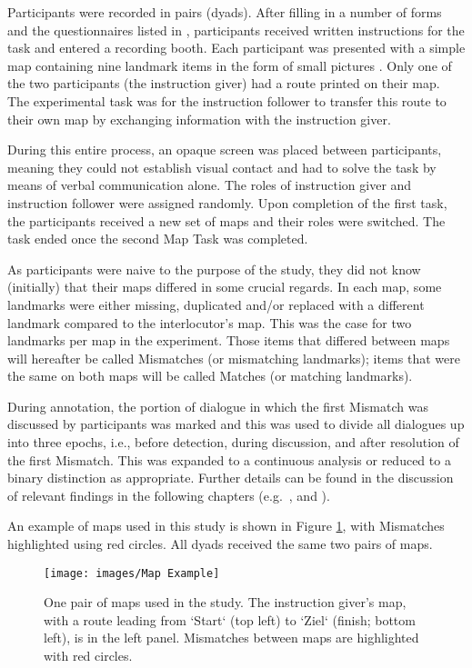 Participants were recorded in pairs (dyads). After filling in a number of forms and the questionnaires listed in , participants received written instructions for the task and entered a recording booth. Each participant was presented with a simple map containing nine landmark items in the form of small pictures \citep[materials adapted from][]{griceMapTasksItalian2003}. Only one of the two participants (the instruction giver) had a route printed on their map. The experimental task was for the instruction follower to transfer this route to their own map by exchanging information with the instruction giver.

During this entire process, an opaque screen was placed between participants, meaning they could not establish visual contact and had to solve the task by means of verbal communication alone. The roles of instruction giver and instruction follower were assigned randomly. Upon completion of the first task, the participants received a new set of maps and their roles were switched. The task ended once the second Map Task was completed.

As participants were naive to the purpose of the study, they did not know (initially) that their maps differed in some crucial regards. In each map, some landmarks were either missing, duplicated and/or replaced with a different landmark compared to the interlocutor's map. This was the case for two landmarks per map in the experiment. Those items that differed between maps will hereafter be called Mismatches (or mismatching landmarks); items that were the same on both maps will be called Matches (or matching landmarks).

During annotation, the portion of dialogue in which the first Mismatch was discussed by participants was marked and this was used to divide all dialogues up into three epochs, i.e., before detection, during discussion, and after resolution of the first Mismatch. This was expanded to a continuous analysis or reduced to a binary distinction as appropriate. Further details can be found in the discussion of relevant findings in the following chapters (e.g.~,  and ).

An example of maps used in this study is shown in Figure \ref{fig:MapTaskExample}, with Mismatches highlighted using red circles. All dyads received the same two pairs of maps.

\begin{figure}
	
	{\centering \texttt{[image: images/Map Example]} 
		
	}
	
	\caption{One pair of maps used in the study. The instruction giver's map, with a route leading from `Start‘ (top left) to `Ziel‘ (finish; bottom left), is in the left panel. Mismatches between maps are highlighted with red circles.}\label{fig:MapTaskExample}
\end{figure}


